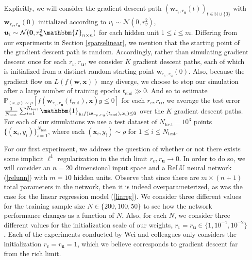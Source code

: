 \documentclass{article}
\begin{document}
Explicitly, we will consider the gradient descent path $(\boldsymbol{w}_{r_v, r_{\boldsymbol{u}}}(t))_{t \in \mathbb{N} \cup \{0\}}$ with $\boldsymbol{w}_{r_v, r_{\boldsymbol{u}}}(0)$ initialized according to $v_i \sim \mathcal{N}(0, r_v^2)$, $\boldsymbol{u}_i \sim \mathcal{N}(\boldsymbol{0}, r_{\boldsymbol{u}}^2 \mathbbm{I}_{n \times n})$ for each hidden unit $1 \leq i \leq m$. Differing from our experiments in Section \ref{sparselinear}, we mention that the starting point of the gradient descent path is random. Accordingly, rather than simulating gradient descent once for each $r_v, r_{\boldsymbol{u}}$, we consider $K$ gradient descent paths, each of which is initialized from a distinct random starting point $\boldsymbol{w}_{r_v, r_{\boldsymbol{u}}}(0)$. Also, because the gradient flow on $L(f(\boldsymbol{w}, \boldsymbol{x}))$ may diverge, we choose to stop our simulation after a large number of training epochs $t_{\text{end}} \gg 0$. And so to estimate $\mathbb{P}_{(x,y) \sim \rho}[f(\boldsymbol{w}_{r_v, r_{\boldsymbol{u}}}(t_{\text{end}}), \boldsymbol{x})y \leq 0]$ for each $r_v, r_{\boldsymbol{u}}$, we average the test error $\frac{1}{N_{\text{test}}}\sum_{i=1}^{N_{\text{test}}} \mathbbm{1}_{y_i f(\boldsymbol{w}_{r_v, r_{\boldsymbol{u}}}(t_{\text{end}}), \boldsymbol{x}_i) \leq 0}$ over the $K$ gradient descent paths. For each of our simulations we use a test dataset of $N_{\text{test}} = 10^3$ points $\{(\boldsymbol{x}_i, y_i) \}_{i=1}^{N_{\text{test}}}$, where each $(\boldsymbol{x}_i, y_i) \sim \rho$ for $1 \leq i \leq N_{\text{test}}$.

For our first experiment, we address the question of whether or not there exists some implicit $\ell^1$ regularization in the rich limit $r_v, r_{\boldsymbol{u}} \rightarrow 0$. In order to do so, we will consider an $n=20$ dimensional input space and a ReLU neural network (\ref{relunn}) with $m=10$ hidden units. Observe that since there are $m \times (n+1)$ total parameters in the network, then it is indeed overparameterized, as was the case for the linear regression model (\ref{linreg}). We consider three different values for the training sample size $N \in \{200, 100, 50\}$ to see how the network performance changes as a function of $N$. Also, for each $N$, we consider three different values for the initialization scale of our weights, $r_v = r_{\boldsymbol{u}} \in \{1, 10^{-1}, 10^{-2}\}$. Each of the experiments conducted by Wei and colleagues only considers the initialization $r_v = r_{\boldsymbol{u}} = 1$, which we believe corresponds to gradient descent far from the rich limit.
\end{document}
